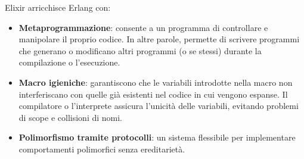 \documentclass{article}
\begin{document}
Elixir arricchisce Erlang con:
\begin{itemize}
    \item \textbf{Metaprogrammazione}: consente a un programma di controllare e manipolare il proprio codice. In altre parole, permette di scrivere programmi che generano o modificano altri programmi (o se stessi) durante la compilazione o l'esecuzione.
    \item \textbf{Macro igieniche}: garantiscono che le variabili introdotte nella macro non interferiscano con quelle già esistenti nel codice in cui vengono espanse. Il compilatore o l'interprete assicura l'unicità delle variabili, evitando problemi di scope e collisioni di nomi.
    \item \textbf{Polimorfismo tramite protocolli}: un sistema flessibile per implementare comportamenti polimorfici senza ereditarietà.
\end{itemize}
\end{document}
